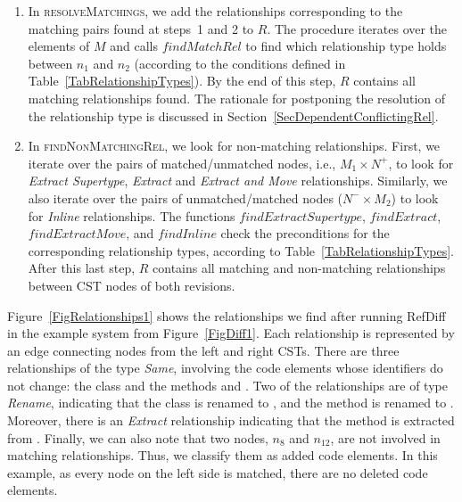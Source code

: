 \begin{enumerate}
\item In \textsc{resolveMatchings}, we add the relationships corresponding to the matching pairs found at steps~1 and 2 to $R$.
The procedure iterates over the elements of $M$ and calls $\mathit{findMatchRel}$ to find which relationship type holds between $n_1$ and $n_2$ (according to the conditions defined in Table~\ref{TabRelationshipTypes}).
By the end of this step, $R$ contains all matching relationships found.
The rationale for postponing the resolution of the relationship type is discussed in Section~\ref{SecDependentConflictingRel}.

\item In \textsc{findNonMatchingRel}, we look for non-matching relationships.
First, we iterate over the pairs of matched/unmatched nodes, i.e., $M_1 \times N^+$, to look for \textit{Extract Supertype}, \textit{Extract} and \textit{Extract and Move} relationships.
Similarly, we also iterate over the pairs of unmatched/matched nodes ($N^- \times M_2$) to look for \textit{Inline} relationships.
The functions $findExtractSupertype$, $findExtract$, $findExtractMove$, and $findInline$ check the  preconditions for the corresponding relationship types, according to Table~\ref{TabRelationshipTypes}.
After this last step, $R$ contains all matching and non-matching relationships between CST nodes of both revisions.
\end{enumerate}


Figure~\ref{FigRelationships1} shows the relationships we find after running RefDiff in the example system from Figure~\ref{FigDiff1}.
Each relationship is represented by an edge connecting nodes from the left and right CSTs.
There are three relationships of the type \textit{Same}, involving the code elements whose identifiers do not change: the class  and the methods  and .
Two of the relationships are of type \textit{Rename}, indicating that the class  is renamed to , and the method  is renamed to .
Moreover, there is an \textit{Extract} relationship indicating that the method  is extracted from .
Finally, we can also note that two nodes, $n_8$ and $n_{12}$, are not involved in matching relationships. Thus, we classify them as added code elements.
In this example, as every node on the left side is matched, there are no deleted code elements.


